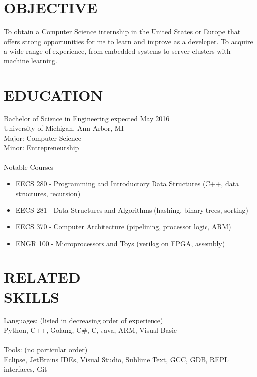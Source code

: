\documentclass[line,margin]{res}
\begin{document}

\color{HeaderColor}
\address{ajlj@umich.edu -- 248-622-7017}
\address{Citizen of the United States and Italy}
 
 \renewcommand{\labelitemi}{$-$}
 
\begin{resume}
\color{black}
\section{\textcolor{HeaderColor}{OBJECTIVE}}
				To obtain a Computer Science internship in the United States or Europe that offers strong opportunities for me to learn and improve as a developer. To acquire a wide range of experience, from embedded systems to server clusters with machine learning.

\section{\textcolor{HeaderColor}{EDUCATION}} {\sc Bachelor of Science in Engineering} \hfill expected May 2016\\
				University of Michigan, Ann Arbor, MI \\
                Major: Computer Science \\
                Minor: Entrepreneurship \\ \\
                {\sc Notable Courses}
                \begin{itemize} \itemsep0em
                \item EECS 280 - Programming and Introductory Data Structures (C++, data structures, recursion)
                \item EECS 281 - Data Structures and Algorithms (hashing, binary trees, sorting)
                \item EECS 370 - Computer Architecture (pipelining, processor logic, ARM)
                \item ENGR 100 - Microprocessors and Toys (verilog on FPGA, assembly) 
                \end{itemize}
 
 
\section{\textcolor{HeaderColor}{RELATED \\ SKILLS}} 
				{\sc Languages: (listed in decreasing order of experience)} \\
				Python, C++, Golang, C\#, C, Java, ARM, Visual Basic \\ \\
                {\sc Tools: (no particular order)} \\
                Eclipse, JetBrains IDEs, Visual Studio, Sublime Text, GCC, GDB, REPL interfaces, Git
 

\end{resume}
\end{document}
